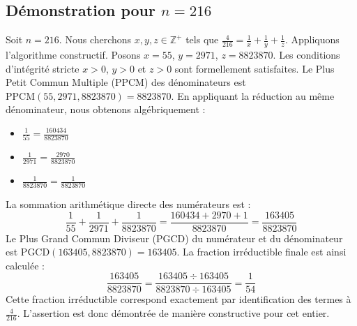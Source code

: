 \documentclass[11pt,a4paper]{article}
\begin{document}
\subsection{Démonstration pour $n = 216$}
Soit $n = 216$. Nous cherchons $x, y, z \in \mathbb{Z}^{+}$ tels que $\frac{4}{216} = \frac{1}{x} + \frac{1}{y} + \frac{1}{z}$.
Appliquons l'algorithme constructif. Posons $x = 55$, $y = 2971$, $z = 8823870$.
Les conditions d'intégrité stricte $x > 0$, $y > 0$ et $z > 0$ sont formellement satisfaites.
Le Plus Petit Commun Multiple (PPCM) des dénominateurs est $\text{PPCM}(55, 2971, 8823870) = 8823870$.
En appliquant la réduction au même dénominateur, nous obtenons algébriquement :
\begin{itemize}
    \item $\frac{1}{55} = \frac{160434}{8823870}$
    \item $\frac{1}{2971} = \frac{2970}{8823870}$
    \item $\frac{1}{8823870} = \frac{1}{8823870}$
\end{itemize}
La sommation arithmétique directe des numérateurs est :
$$ \frac{1}{55} + \frac{1}{2971} + \frac{1}{8823870} = \frac{160434 + 2970 + 1}{8823870} = \frac{163405}{8823870} $$
Le Plus Grand Commun Diviseur (PGCD) du numérateur et du dénominateur est $\text{PGCD}(163405, 8823870) = 163405$.
La fraction irréductible finale est ainsi calculée :
$$ \frac{163405}{8823870} = \frac{163405 \div 163405}{8823870 \div 163405} = \frac{1}{54} $$
Cette fraction irréductible correspond exactement par identification des termes à $\frac{4}{216}$. L'assertion est donc démontrée de manière constructive pour cet entier.
\end{document}
